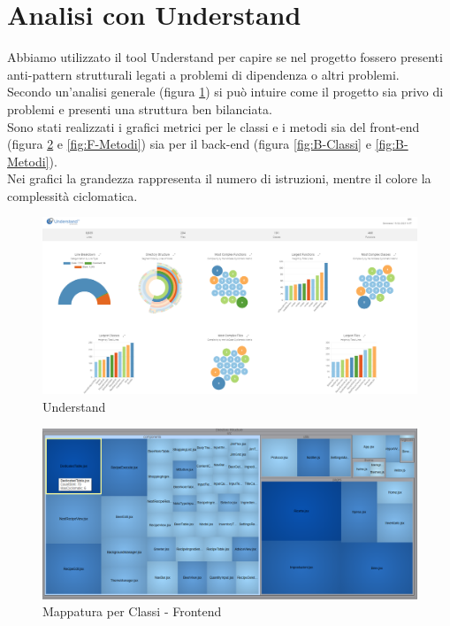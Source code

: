 \documentclass[a4paper,12pt]{report}
\begin{document}
      	\section{Analisi con Understand}
Abbiamo utilizzato il tool Understand per capire se nel progetto fossero presenti anti-pattern strutturali legati a problemi di dipendenza o altri problemi.\\
Secondo un'analisi generale (figura \ref{fig:understand}) si può intuire come il progetto sia privo di problemi e presenti una struttura ben bilanciata.\\
Sono stati realizzati i grafici metrici per le classi e i metodi sia del front-end (figura \ref{fig:F-Classi} e \ref{fig:F-Metodi}) sia per il back-end (figura \ref{fig:B-Classi} e \ref{fig:B-Metodi}).\\
Nei grafici la grandezza rappresenta il numero di istruzioni, mentre il colore la complessità ciclomatica.\\
		\begin{figure}[!h]
			\centering
			\includegraphics[width=1\linewidth]{image/understand.png}
			\caption{Understand}\label{fig:understand}
		\end{figure}
		
		\begin{figure}[!h]
			\centering
			\includegraphics[width=1\linewidth]{image/F-Classi.png}
			\caption{Mappatura per Classi - Frontend}\label{fig:F-Classi}
		\end{figure}    
\end{document}
